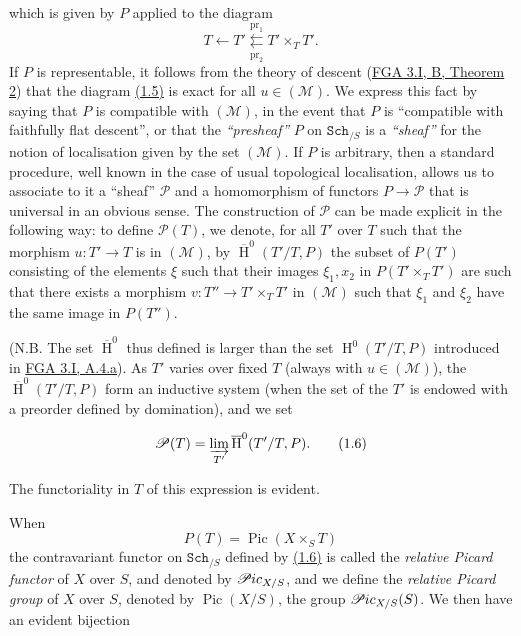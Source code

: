 \documentclass{article}
\newenvironment{eqenv}
  {}
  {}
\newcommand{\oldpage}[1]{\marginpar{\footnotesize$\Big\vert$ \textit{p.~#1}}}
\theoremstyle{definition}
\theoremstyle{definition}
\theoremstyle{definition}
\theoremstyle{definition}
\theoremstyle{remark}
\begin{document}
which is given by \(P\) applied to the diagram
\[
  T
  \leftarrow T'
  \underset{\mathrm{pr}_2}{\overset{\mathrm{pr}_1}{\leftleftarrows}} T'\times_T T'.
\]
If \(P\) is representable, it follows from the theory of descent (\protect\hyperlink{fga-3-i-section-B.1-theorem-2}{FGA 3.I, B, Theorem 2}) that the diagram \protect\hyperlink{fga-3-v-equation-1.5}{(1.5)} is exact for all \(u\in({\mathscr{M}})\).
We express this fact by saying that \(P\) is compatible with \(({\mathscr{M}})\), in the event that \(P\) is ``compatible with faithfully flat descent'', or that the \emph{``presheaf''} \(P\) on \(\mathtt{Sch}_{/S}\) is a \emph{``sheaf''} for the notion of localisation given by the set \(({\mathscr{M}})\).
If \(P\) is arbitrary, then a standard procedure, well known in the case of usual topological localisation, allows us to associate to it a ``sheaf'' \({\mathscr{P}}\) and a homomorphism of functors \(P\to{\mathscr{P}}\) that is universal in an obvious sense.
The construction of \({\mathscr{P}}\) can be made explicit in the following way: to define \({\mathscr{P}}(T)\), we denote, for all \(T'\) over \(T\) such that the morphism \(u\colon T'\to T\) is in \(({\mathscr{M}})\), by \(\overline{\operatorname{H}}^0(T'/T,P)\) the subset of \(P(T')\) consisting of the elements \(\xi\) such that their images \(\xi_1,x_2\) in \(P(T'\times_T T')\) are such that there exists a morphism \(v\colon T''\to T'\times_T T'\) in \(({\mathscr{M}})\) such that \(\xi_1\) and \(\xi_2\) have the same image in \(P(T'')\).

\oldpage{232-03}(N.B. The set \(\overline{\operatorname{H}}^0\) thus defined is larger than the set \(\operatorname{H}^0(T'/T,P)\) introduced in \protect\hyperlink{fga-3-i-section-A.4.a}{FGA 3.I, A.4.a}).
As \(T'\) varies over fixed \(T\) (always with \(u\in({\mathscr{M}})\)), the \(\overline{\operatorname{H}}^0(T'/T,P)\) form an inductive system (when the set of the \(T'\) is endowed with a preorder defined by domination), and we set

\leavevmode{}%
\begin{eqenv}
\[
  {\mathscr{P}}(T)
  = \varinjlim_{T'} \overline{\operatorname{H}}^0(T'/T,P).
\tag{1.6}
\]

\end{eqenv}

The functoriality in \(T\) of this expression is evident.

When
\[
  P(T)
  = \operatorname{Pic}(X\times_S T)
\]
the contravariant functor on \(\mathtt{Sch}_{/S}\) defined by \protect\hyperlink{fga-3-v-equation-1.6}{(1.6)} is called the \emph{relative Picard functor} of \(X\) over \(S\), and denoted by \(\mathscr{P}\kern -.5pt ic_{X/S}\), and we define the \emph{relative Picard group} of \(X\) over \(S\), denoted by \(\operatorname{Pic}(X/S)\), the group \(\mathscr{P}\kern -.5pt ic_{X/S}(S)\).
We then have an evident bijection
\end{document}
